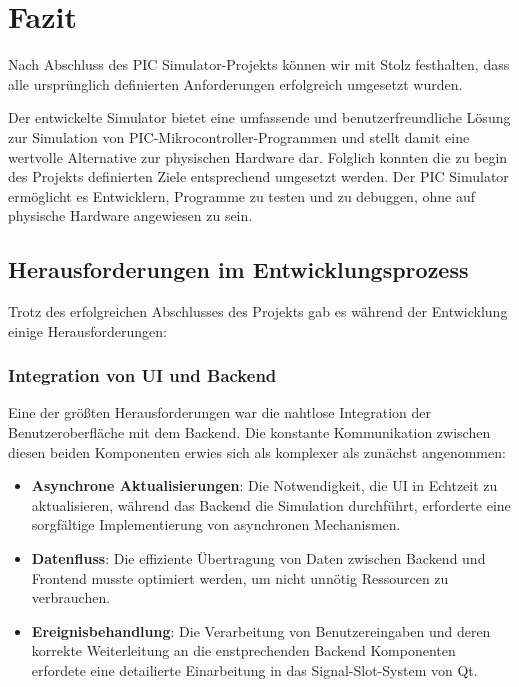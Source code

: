 \chapter{Fazit}

Nach Abschluss des PIC Simulator-Projekts können wir mit Stolz festhalten, dass alle ursprünglich definierten Anforderungen erfolgreich umgesetzt wurden. 

Der entwickelte Simulator bietet eine umfassende und benutzerfreundliche Lösung zur Simulation von PIC-Mikrocontroller-Programmen und stellt damit eine wertvolle Alternative zur physischen Hardware dar. Folglich konnten die zu begin des Projekts definierten Ziele entsprechend umgesetzt werden. Der PIC Simulator ermöglicht es Entwicklern, Programme zu testen und zu debuggen, ohne auf physische Hardware angewiesen zu sein.

\section{Herausforderungen im Entwicklungsprozess}

Trotz des erfolgreichen Abschlusses des Projekts gab es während der Entwicklung einige Herausforderungen:

\subsection{Integration von UI und Backend}

Eine der größten Herausforderungen war die nahtlose Integration der Benutzeroberfläche mit dem Backend. Die konstante Kommunikation zwischen diesen beiden Komponenten erwies sich als komplexer als zunächst angenommen:

\begin{itemize}
    \item \textbf{Asynchrone Aktualisierungen}: Die Notwendigkeit, die UI in Echtzeit zu aktualisieren, während das Backend die Simulation durchführt, erforderte eine sorgfältige Implementierung von asynchronen Mechanismen.
    \item \textbf{Datenfluss}: Die effiziente Übertragung von Daten zwischen Backend und Frontend musste optimiert werden, um nicht unnötig Ressourcen zu verbrauchen.
    \item \textbf{Ereignisbehandlung}: Die Verarbeitung von Benutzereingaben und deren korrekte Weiterleitung an die enstprechenden Backend Komponenten erfordete eine detailierte Einarbeitung in das Signal-Slot-System von Qt.
\end{itemize}

